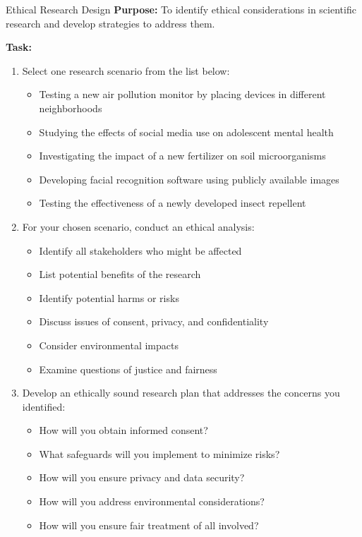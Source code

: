 \begin{investigation}{Ethical Research Design}
\textbf{Purpose:} To identify ethical considerations in scientific research and develop strategies to address them.

\textbf{Task:}
\begin{enumerate}
    \item Select one research scenario from the list below:
    \begin{itemize}
        \item Testing a new air pollution monitor by placing devices in different neighborhoods
        \item Studying the effects of social media use on adolescent mental health
        \item Investigating the impact of a new fertilizer on soil microorganisms
        \item Developing facial recognition software using publicly available images
        \item Testing the effectiveness of a newly developed insect repellent
    \end{itemize}
    
    \item For your chosen scenario, conduct an ethical analysis:
    \begin{itemize}
        \item Identify all stakeholders who might be affected
        \item List potential benefits of the research
        \item Identify potential harms or risks
        \item Discuss issues of consent, privacy, and confidentiality
        \item Consider environmental impacts
        \item Examine questions of justice and fairness
    \end{itemize}
    
    \item Develop an ethically sound research plan that addresses the concerns you identified:
    \begin{itemize}
        \item How will you obtain informed consent?
        \item What safeguards will you implement to minimize risks?
        \item How will you ensure privacy and data security?
        \item How will you address environmental considerations?
        \item How will you ensure fair treatment of all involved?
    \end{itemize}
    

\end{enumerate}
\end{investigation}
